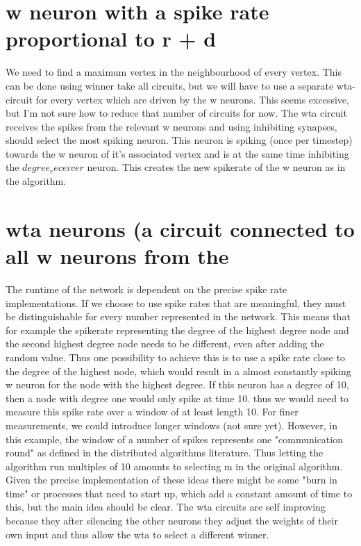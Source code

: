 \section{w neuron with a spike rate proportional to r + d}\label{sec:weight_neuron}
We need to find a maximum vertex in the neighbourhood of every vertex. This
can be done using winner take all circuits, but we will have to use a separate
wta-circuit for every vertex which are driven by the w neurons. This seems
excessive, but I'm not sure how to reduce that number of circuits for now. The
wta circuit receives the spikes from the relevant w neurons and using inhibiting synapses, should select the most spiking neuron. This neuron is spiking (once
per timestep) towards the w neuron of it's associated vertex and is at the same
time inhibiting the $degree_receiver$ neuron. This creates the new spikerate of
the w neuron as in the algorithm.

\section{wta neurons (a circuit connected to all w neurons from the}\label{sec:wta_circuits}

The runtime of the network is dependent on the precise spike rate
implementations. If we choose to use spike rates that are meaningful, they
must be distinguishable for every number represented in the network. This
means that for example the spikerate representing the degree of the highest
degree node and the second highest degree node needs to be different, even
after adding the random value. Thus one possibility to achieve this is to use a
spike rate close to the degree of the highest node, which would result in a
almost constantly spiking w neuron for the node with the highest degree. If this
neuron has a degree of 10, then a node with degree one would only spike at
time 10. thus we would need to measure this spike rate over a window of at
least length 10. For finer measurements, we could introduce longer windows
(not sure yet). However, in this example, the window of a number of spikes
represents one "communication round" as defined in the distributed algorithms
literature. Thus letting the algorithm run multiples of 10 amounts to selecting m
in the original algorithm. Given the precise implementation of these ideas there
might be some "burn in time" or processes that need to start up, which add a
constant amount of time to this, but the main idea should be clear. The wta
circuits are self improving because they after silencing the other neurons they
adjust the weights of their own input and thus allow the wta to select a different
winner.
